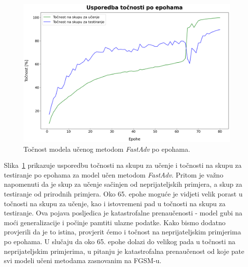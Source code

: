 \documentclass[times, utf8, zavrsni, numeric]{fer}
\begin{document}
\pagebreak
\begin{figure}[htb]
    \centering
    \includegraphics[scale=0.41]{../stats/resnet18_fast_epochs_80_lr_0.2_no_early/accuracies.png}
    \caption{Točnost modela učenog metodom \textit{FastAdv} po epohama.}
    \label{fig:fast_acc}
\end{figure}

Slika~\ref{fig:fast_acc} prikazuje usporedbu točnosti na skupu za učenje i točnosti na skupu za testiranje po epohama za model učen metodom \textit{FastAdv}.
Pritom je važno napomenuti da je skup za učenje sačinjen od neprijateljskih primjera, a skup za testiranje od prirodnih primjera.
Oko 65. epohe moguće je vidjeti velik porast u točnosti na skupu za učenje, kao i istovremeni pad u točnosti na skupu za testiranje.
Ova pojava posljedica je katastrofalne prenaučenosti - model gubi na moći generalizacije i počinje pamtiti ulazne podatke. 
Kako bismo dodatno provjerili da je to istina, provjerit ćemo i točnost na neprijateljskim primjerima po epohama. 
U slučaju da oko 65. epohe dolazi do velikog pada u točnosti na neprijateljskim primjerima, 
u pitanju je katastrofalna prenaučenost od koje pate svi modeli učeni metodama zasnovanim na FGSM-u.
\end{document}
